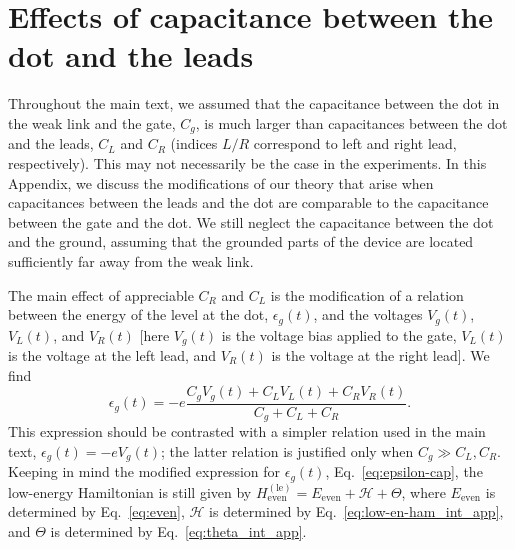 \documentclass[aps,reprint,longbibliography, prb]{revtex4-2}
\begin{document}
\section{Effects of capacitance between the dot and the leads\label{app:cap}}
Throughout the main text, we assumed that the capacitance between the dot in the weak link and the gate, $C_g$, is much larger than capacitances between the dot and the leads, $C_L$ and $C_R$ (indices $L/R$ correspond to left and right lead, respectively). This may not necessarily be the case in the experiments. In this Appendix, we discuss the modifications of our theory that arise when capacitances between the leads and the dot are comparable to the capacitance between the gate and the dot. We still neglect the capacitance between the dot and the ground, assuming that the grounded parts of the device are located sufficiently far away from the weak link.

The main effect of appreciable $C_R$ and $C_L$ is the modification of a relation between the energy of the level at the dot, $\epsilon_g(t)$, and the voltages $V_g(t)$, $V_L(t)$, and $V_R(t)$ [here $V_g(t)$ is the voltage bias applied to the gate, $V_L(t)$ is the voltage at the left lead, and $V_R(t)$ is the voltage at the right lead]. We find
\begin{equation}
    \label{eq:epsilon-cap}
    \epsilon_g(t) = -e\frac{C_g V_g(t) + C_L V_L(t) + C_R V_R(t)}{C_g + C_L + C_R }.
\end{equation}
This expression should be contrasted with a simpler relation used in the main text, $\epsilon_g(t) = -eV_g(t)$; the latter relation is justified only when $C_g \gg C_L,C_R$. Keeping in mind the modified expression for $\epsilon_g(t)$, Eq.~\eqref{eq:epsilon-cap}, the low-energy Hamiltonian is still given by $H_\mathrm{even}^{\mathrm{(le)}} = E_\mathrm{even} + \mathcal{H} + \Theta$, where $E_\mathrm{even}$ is determined by Eq.~\eqref{eq:even}, $\mathcal{H}$ is determined by Eq.~\eqref{eq:low-en-ham_int_app}, and $\Theta$ is determined by Eq.~\eqref{eq:theta_int_app}.
\end{document}
